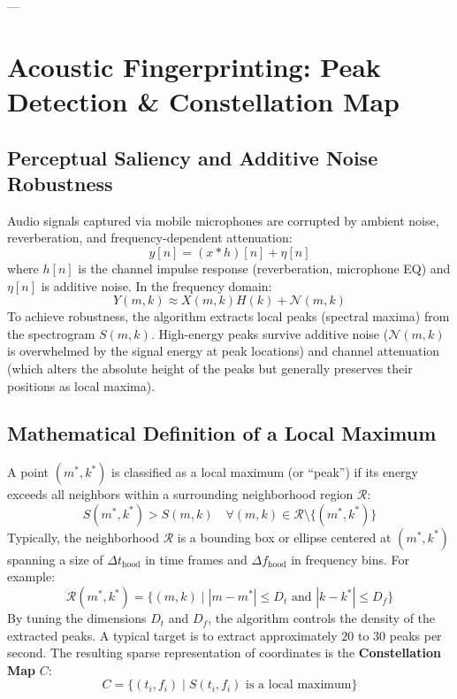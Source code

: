 \documentclass[11pt,journal,onecolumn]{IEEEtran}
\begin{document}
---

\section{Acoustic Fingerprinting: Peak Detection \& Constellation Map}

\subsection{Perceptual Saliency and Additive Noise Robustness}
Audio signals captured via mobile microphones are corrupted by ambient noise, reverberation, and frequency-dependent attenuation:
\begin{equation}
y[n] = (x * h)[n] + \eta[n]
\end{equation}
where $h[n]$ is the channel impulse response (reverberation, microphone EQ) and $\eta[n]$ is additive noise. In the frequency domain:
\begin{equation}
Y(m, k) \approx X(m, k) H(k) + \mathcal{N}(m, k)
\end{equation}
To achieve robustness, the algorithm extracts local peaks (spectral maxima) from the spectrogram $S(m, k)$. High-energy peaks survive additive noise ($\mathcal{N}(m, k)$ is overwhelmed by the signal energy at peak locations) and channel attenuation (which alters the absolute height of the peaks but generally preserves their positions as local maxima).

\subsection{Mathematical Definition of a Local Maximum}
A point $(m^*, k^*)$ is classified as a local maximum (or ``peak'') if its energy exceeds all neighbors within a surrounding neighborhood region $\mathcal{R}$:
\begin{equation}
S(m^*, k^*) > S(m, k) \quad \forall (m, k) \in \mathcal{R} \setminus \{(m^*, k^*)\}
\end{equation}
Typically, the neighborhood $\mathcal{R}$ is a bounding box or ellipse centered at $(m^*, k^*)$ spanning a size of $\Delta t_{\text{hood}}$ in time frames and $\Delta f_{\text{hood}}$ in frequency bins. For example:
\begin{equation}
\mathcal{R}(m^*, k^*) = \{ (m, k) \mid |m - m^*| \le D_t \text{ and } |k - k^*| \le D_f \}
\end{equation}
By tuning the dimensions $D_t$ and $D_f$, the algorithm controls the density of the extracted peaks. A typical target is to extract approximately $20$ to $30$ peaks per second. The resulting sparse representation of coordinates is the \textbf{Constellation Map} $C$:
\begin{equation}
C = \{ (t_i, f_i) \mid S(t_i, f_i) \text{ is a local maximum} \}
\end{equation}
\end{document}

